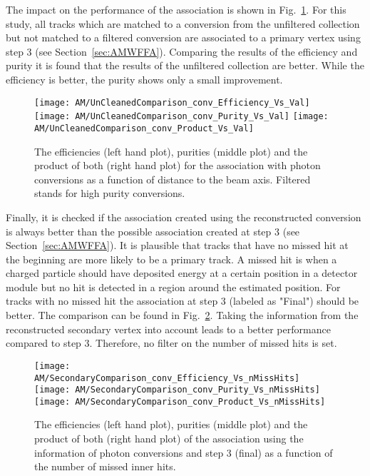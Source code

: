 The impact on the performance of the association is shown in Fig.~\ref{plot:AMWFSVpcEffAndPurRT}. For this study, all tracks which are matched to a conversion from the unfiltered collection but not matched to a filtered conversion are associated to a primary vertex using step 3 (see Section~\ref{sec:AMWFFA}). Comparing the results of the efficiency and purity it is found that the results of the unfiltered collection are better. While the efficiency is better, the purity shows only a small improvement.

\begin{figure}[!ht]
    \centering
    \texttt{[image: AM/UnCleanedComparison\_conv\_Efficiency\_Vs\_Val]}
    \texttt{[image: AM/UnCleanedComparison\_conv\_Purity\_Vs\_Val]}
    \texttt{[image: AM/UnCleanedComparison\_conv\_Product\_Vs\_Val]}
    \caption[Efficiencies, purities and their product for the association with photon conversions a function of distance to the beam axis]{The efficiencies (left hand plot), purities (middle plot) and the product of both (right hand plot) for the association with photon conversions as a function of distance to the beam axis. Filtered stands for high purity conversions.\label{plot:AMWFSVpcEffAndPurRT}}
\end{figure}

Finally, it is checked if the association created using the reconstructed conversion is always better than the possible association created at step 3 (see Section~\ref{sec:AMWFFA}). It is plausible that tracks that have no missed hit at the beginning are more likely to be a primary track. A missed hit is when a charged particle should have deposited energy at a certain position in a detector module but no hit is detected in a region around the estimated position. For tracks with no missed hit the association at step 3 (labeled as "Final") should be better. The comparison can be found in Fig.~\ref{plot:AMWFSVpcEffAndPurVsFA}. Taking the information from the reconstructed secondary vertex into account leads to a better performance compared to step 3. Therefore, no filter on the number of missed hits is set.

\begin{figure}[!ht]
    \centering
    \texttt{[image: AM/SecondaryComparison\_conv\_Efficiency\_Vs\_nMissHits]}
    \texttt{[image: AM/SecondaryComparison\_conv\_Purity\_Vs\_nMissHits]}
    \texttt{[image: AM/SecondaryComparison\_conv\_Product\_Vs\_nMissHits]}
    \caption[Efficiencies, purities and their product for  the association with photon conversions vs final association as a function of missed inner hits]{The efficiencies (left hand plot), purities (middle plot) and the product of both (right hand plot) of the association using the information of photon conversions and step 3 (final) as a function of the number of missed inner hits.\label{plot:AMWFSVpcEffAndPurVsFA}}
\end{figure}

